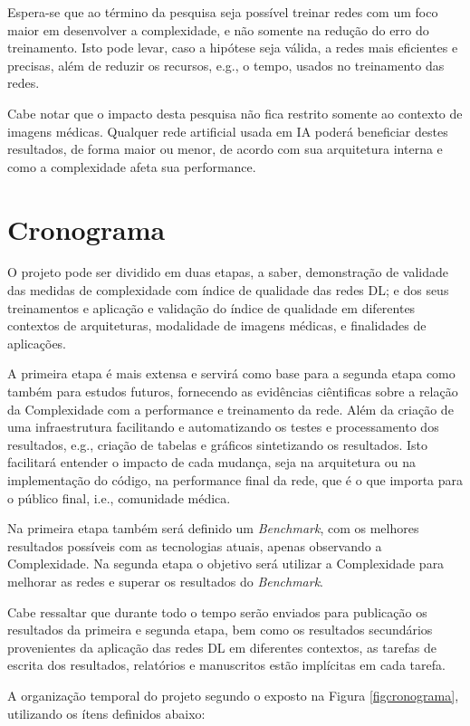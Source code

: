 \documentclass[
	12pt,				%
	openany,oneside,
	a4paper,			%
	english,			%
	brazil,				%
	]{abntex2}
\begin{document}
Espera-se que ao término da pesquisa seja possível treinar redes com um foco maior em desenvolver a complexidade, e não somente na redução do erro do treinamento. Isto pode levar, caso a hipótese seja válida, a redes mais eficientes e precisas, além de reduzir os recursos, e.g., o tempo, usados no treinamento das redes.

Cabe notar que o impacto desta pesquisa não fica restrito somente ao contexto de imagens médicas. Qualquer rede artificial usada em IA poderá beneficiar destes resultados, de forma maior ou menor, de acordo com sua arquitetura interna e como a complexidade afeta sua performance.

\chapter{Cronograma}
O projeto pode ser dividido em duas etapas, a saber, demonstração de validade das medidas de complexidade com índice de qualidade das redes DL; e dos seus treinamentos e aplicação e validação do índice de qualidade em diferentes contextos de arquiteturas, modalidade de imagens médicas, e finalidades de aplicações. 

A primeira etapa é mais extensa e servirá como base para a segunda etapa como também para estudos futuros, fornecendo as evidências ciêntificas sobre a relação da Complexidade com a performance e treinamento da rede. Além da criação de uma infraestrutura facilitando e automatizando os testes e processamento dos resultados, e.g., criação de tabelas e gráficos sintetizando os resultados. Isto facilitará entender o impacto de cada mudança, seja na arquitetura ou na implementação do código, na performance final da rede, que é o que importa para o público final, i.e., comunidade médica.
 
Na primeira etapa também será definido um \textit{Benchmark}, com os melhores resultados possíveis com as tecnologias atuais, apenas observando a Complexidade. Na segunda etapa o objetivo será utilizar a Complexidade para melhorar as redes e superar os resultados do \textit{Benchmark}.

Cabe ressaltar que durante todo o tempo serão enviados para publicação os resultados da primeira e segunda etapa, bem como os resultados secundários provenientes da aplicação das redes DL em diferentes contextos, as tarefas de escrita dos resultados, relatórios e manuscritos estão implícitas em cada tarefa.

A organização temporal do projeto segundo o exposto na Figura \ref{figcronograma}, utilizando os ítens definidos abaixo:
\end{document}
